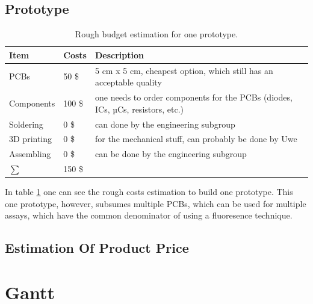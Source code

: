 \documentclass{report}
\begin{document}
\section{Prototype}
\begin{table}[H]
\centering
\begin{tabular}{lll}
\textbf{Item} & \textbf{Costs} & \textbf{Description}                                                           \\\hline
PCBs          & 50 \$          & 5 cm x 5 cm, cheapest option, which still has an acceptable quality            \\
Components    & 100 \$         & one needs to order components for the PCBs (diodes, ICs, µCs, resistors, etc.) \\
Soldering     & 0 \$           & can done by the engineering subgroup                                           \\
3D printing   & 0 \$           & for the mechanical stuff, can probably be done by Uwe                          \\
Assembling    & 0 \$           & can be done by the engineering subgroup                                       	\\\hline
\ensuremath{\sum}& 150 \$
\end{tabular}
\caption{Rough budget estimation for one prototype.}
\label{tab:prototype_budget}
\end{table}
In table \ref{tab:prototype_budget} one can see the rough costs estimation to build one prototype. This one prototype, however, subsumes multiple PCBs, which can be used for multiple assays, which have the common denominator of using a fluoresence technique. 
\section{Estimation Of Product Price}

\chapter{Gantt}

\printbibliography[heading=bibintoc]

\clearpage
{}
\setcounter{page}{\value{roman}}
\pagestyle{empty}
\appendix
\end{document}
